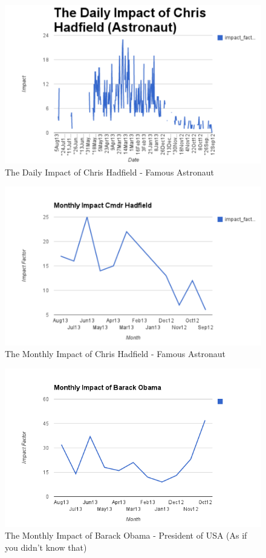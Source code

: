 \begin{figure}[h!]
\centering
\includegraphics{Images/daily_impact_chris_hadfield.pdf}
\caption{The Daily Impact of Chris Hadfield - Famous Astronaut}
\end{figure}

\begin{figure}[h!]
\centering
\includegraphics{Images/monthly_impact_chris_hadfield.pdf}
\caption{The Monthly Impact of Chris Hadfield - Famous Astronaut}
\end{figure}

\begin{figure}[h!]
\centering
\includegraphics{Images/monthly_impact_barack_obama.png}
\caption{The Monthly Impact of Barack Obama - President of USA (As if you didn't know that)}
\end{figure}

